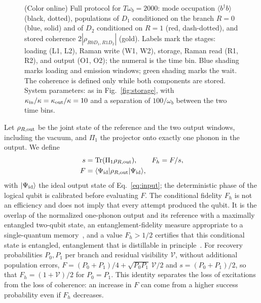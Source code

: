 \documentclass[aps,pra,preprint,groupedaddress,amsmath,amssymb,floatfix]{revtex4-2}
\newcommand{\ket}[1]{\lvert #1\rangle}
\newcommand{\bra}[1]{\langle #1\rvert}
\begin{document}
\begin{figure}[t]
\centering
\resizebox{\columnwidth}{!}{}
\caption{(Color online) Full protocol for $T\omega_b=2000$: mode occupation $\langle b^\dagger b\rangle$ (black, dotted), populations of $D_1$ conditioned on the branch $R=0$ (blue, solid) and of $D_2$ conditioned on $R=1$ (red, dash-dotted), and stored coherence $2|\rho_{R0D_1,R1D_2}|$ (gold). Labels mark the stages: loading (L1, L2), Raman write (W1, W2), storage, Raman read (R1, R2), and output (O1, O2); the numeral is the time bin. Blue shading marks loading and emission windows; green shading marks the wait. The coherence is defined only while both components are stored. System parameters: as in Fig.~\ref{fig:storage}, with $\kappa_{\rm in}/\kappa=\kappa_{\rm out}/\kappa=10$ and a separation of $100/\omega_b$ between the two time bins.}
\label{fig:protocol}
\end{figure}

Let $\rho_{R,{\rm out}}$ be the joint state of the reference and the two output windows, including the vacuum, and $\Pi_1$ the projector onto exactly one phonon in the output. We define
\begin{align}
s&=\mathrm{Tr}(\Pi_1\rho_{R,{\rm out}}),\qquad
F_h=F/s,\nonumber\\
F&=\bra{\Psi_{\rm id}}\rho_{R,{\rm out}}\ket{\Psi_{\rm id}},\label{eq:metrics}
\end{align}
with $\ket{\Psi_{\rm id}}$ the ideal output state of Eq.~\eqref{eq:input}; the deterministic phase of the logical qubit is calibrated before evaluating $F$. The conditional fidelity $F_h$ is not an efficiency and does not imply that every attempt produced the qubit. It is the overlap of the normalized one-phonon output and its reference with a maximally entangled two-qubit state, an entanglement-fidelity measure appropriate to a single-quantum memory~\cite{surmacz2006}, and a value $F_h>1/2$ certifies that this conditional state is entangled, entanglement that is distillable in principle~\cite{bennett1996,horodecki1997}. For recovery probabilities $P_0,P_1$ per branch and residual visibility $\mathcal V$, without additional population errors, $F=(P_0+P_1)/4+\sqrt{P_0P_1}\,\mathcal V/2$ and $s=(P_0+P_1)/2$, so that $F_h=(1+\mathcal V)/2$ for $P_0=P_1$. This identity separates the loss of excitations from the loss of coherence: an increase in $F$ can come from a higher success probability even if $F_h$ decreases.
\end{document}
